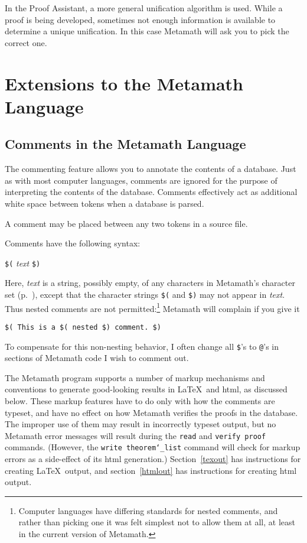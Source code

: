 In the Proof Assistant, a more general unification
algorithm is used.  While a proof is being developed, sometimes not enough
information is available to determine a unique unification.  In this case
Metamath will ask you to pick the correct one.

\section{Extensions to the Metamath Language}

\subsection{Comments in the Metamath Language}\label{comments}

The commenting feature allows you to annotate the contents of
a database.  Just as with most
computer languages, comments are ignored for the purpose of interpreting the
contents of the database. Comments effectively act as
additional white space between tokens
when a database is parsed.

A comment may be placed between any two tokens in a source file.

Comments have the following syntax:
\begin{center}
 \texttt{\$(} {\em text} \texttt{\$)}
\end{center}
Here, {\em text} is a string, possibly empty, of any
characters in Metamath's character set (p.~\pageref{spec1chars}), except
that the character strings \texttt{\$(} and \texttt{\$)} may not appear
in {\em text}.  Thus nested comments are not
permitted:\footnote{Computer languages have differing standards for
nested comments, and rather than picking one it was felt simplest not to
allow them at all, at least in the current version of
Metamath.} Metamath will
complain if you give it
\begin{center}
 \texttt{\$( This is a \$( nested \$) comment.\ \$)}
\end{center}
To compensate for this non-nesting behavior, I often change all \texttt{\$}'s
to \texttt{@}'s in sections of Metamath code I wish to comment out.

The Metamath program supports a number of markup mechanisms and conventions
to generate good-looking results in \LaTeX\ and {\sc html},
as discussed below.
These markup features have to do only with how the comments are typeset,
and have no effect on how Metamath verifies the proofs in the database.
The improper
use of them may result in incorrectly typeset output, but no Metamath
error messages will result during the \texttt{read} and \texttt{verify
proof} commands.  (However, the \texttt{write
theorem\texttt{\char`\_}list} command
will check for markup errors as a side-effect of its
{\sc html} generation.)
Section~\ref{texout} has instructions for creating \LaTeX\ output, and
section~\ref{htmlout} has instructions for creating
{\sc html} output.

